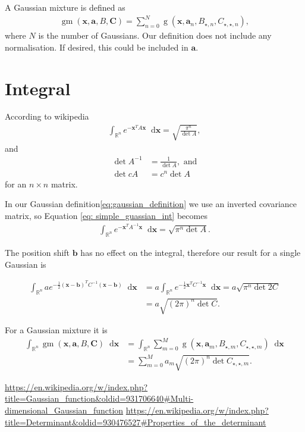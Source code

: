 \documentclass{paper}
\newcommand{\vr}[1]{\ensuremath{\boldsymbol{#1}}}
\newcommand{\tr}[1]{\ensuremath{\boldsymbol{#1}}}
\newcommand{\f}[1]{\operatorname{#1}}
\newcommand*\diff{\mathop{}\!\mathrm{d}}
\begin{document}
A Gaussian mixture is defined as
\begin{align}
	\f{gm}(\vr{x}, \vr{a}, B, \tr{C}) = \sum_{n=0}^{N} \f{g}(\vr{x}, \vr{a}_n, B_{\star, n}, C_{\star, \star, n}),
\end{align}
where $N$ is the number of Gaussians.
Our definition does not include any normalisation.
If desired, this could be included in $\vr{a}$.


\section{Integral}
According to wikipedia\cite{wiki_simple_gaussian_int}
\begin{align}
	\label{eq: simple_guassian_int}
	\int_{\mathbb{R}^n} e^{-\vr{x}^TA\vr{x}} \diff \vr{x} = \sqrt{\frac{\pi^n}{\det{A}}},
\end{align}
and\cite{wiki_det_inverse}
\begin{align}
\det{A^{-1}} &= \frac{1}{\det{A}}, \text{ and}\\
\det{cA} &= c^n \det{A}
\end{align}
for an $n \times n$ matrix.

In our Gaussian definition\ref{eq:gaussian_definition} we use an inverted covariance matrix, so Equation \ref{eq: simple_guassian_int} becomes
\begin{align}
	\int_{\mathbb{R}^n} e^{-\vr{x}^TA^{-1}\vr{x}} \diff \vr{x} = \sqrt{\pi^n \det{A}}.
\end{align}

The position shift $\vr{b}$ has no effect on the integral, therefore our result for a single Gaussian is

\begin{align}
	\int_{\mathbb{R}^n} a e^{-\frac{1}{2}(\vr{x}-\vr{b})^TC^{-1}(\vr{x}-\vr{b})} \diff \vr{x} &= a \int_{\mathbb{R}^n} e^{-\frac{1}{2}\vr{x}^TC^{-1}\vr{x}} \diff \vr{x} = a \sqrt{\pi^n \det{2 C}} \\
	&= a \sqrt{(2 \pi)^n \det{C}}.
\end{align}

For a Gaussian mixture it is
\begin{align}
	\int_{\mathbb{R}^n} \f{gm}(\vr{x}, \vr{a}, B, \tr{C}) \diff \vr{x} &= \int_{\mathbb{R}^n} \sum_{m=0}^{M} \f{g}(\vr{x}, \vr{a}_m, B_{\star, m}, C_{\star, \star, m}) \diff \vr{x} \\
	&= \sum_{m=0}^{M} a_m \sqrt{(2 \pi)^n \det{C_{\star, \star, m}}}.
\end{align}


\begin{thebibliography}{9}%
	 \url{https://en.wikipedia.org/w/index.php?title=Gaussian_function&oldid=931706640#Multi-dimensional_Gaussian_function}
	 \url{https://en.wikipedia.org/w/index.php?title=Determinant&oldid=930476527#Properties_of_the_determinant}
\end{thebibliography}
\end{document}
